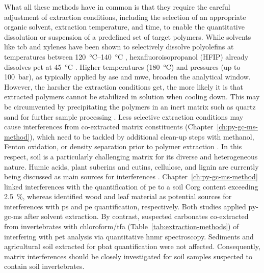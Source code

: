 What all these methods have in common is that they require the careful adjustment of extraction conditions, including the selection of an appropriate organic solvent, extraction temperature, and time, to enable the quantitative dissolution or suspension of a predefined set of target polymers. While solvents like \ac{tcb} and xylenes have been shown to selectively dissolve polyolefins at temperatures between \SIrange[range-phrase = { and }]{120}{140}{\degreeCelsius} \citep[Chapter~\ref{ch:py-gc-ms-method};][]{CeccariniHidden2018}, hexafluoroisopropanol (HFIP) already dissolves \ac{pet} at \SI{45}{\degreeCelsius} \citep{ElertComparison2017}. Higher temperatures (\SI{180}{\degreeCelsius}) and pressures (up to \SI{100}{\bar}), as typically applied by \ac{ase} and \ac{mwe}, broaden the analytical window. However, the harsher the extraction conditions get, the more likely it is that extracted polymers cannot be stabilized in solution when cooling down. This may be circumvented by precipitating the polymers in an inert matrix such as quartz sand for further sample processing \citep{DierkesQuantification2019}. Less selective extraction conditions may cause interferences from co-extracted matrix constituents (Chapter~\ref{ch:py-gc-ms-method}), which need to be tackled by additional clean-up steps with methanol, Fenton oxidation, or density separation prior to polymer extraction \citep{DierkesQuantification2019,PeezQuantitative2019}. In this respect, soil is a particularly challenging matrix for its diverse and heterogeneous nature.
Humic acids, plant suberins and cutins, cellulose, and lignin are currently being discussed as main sources for interferences \citep[Chapter~\ref{ch:py-gc-ms-method};][]{DierkesQuantification2019,OkoffoIdentification2020}.
Chapter~\ref{ch:py-gc-ms-method} linked interferences with the quantification of \ac{pe} to a soil \ac{Corg} content exceeding \SI{2.5}{\percent}, whereas \citet{DierkesQuantification2019} identified wood and leaf material as potential sources for interferences with \ac{ps} and \ac{pe} quantification, respectively. Both studies applied \ac{py-gc-ms} after solvent extraction. By contrast, \citet{PeezQuantitative2019} suspected carbonates co-extracted from invertebrates with chloroform\slash\ac{tfa} (Table~\ref{tab:extraction-methods}) of interfering with \ac{pet} analysis via quantitative \ac{hnmr} spectroscopy.
Sediments \citep{PeezQuantitative2019} and agricultural soil extracted for \ac{pbat} quantification \citep{NelsonQuantification2019} were not affected. Consequently, matrix interferences should be closely investigated for soil samples suspected to contain soil invertebrates.


